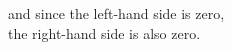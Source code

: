 \documentclass[preview]{standalone}
\begin{document}
\begin{center}
and since the left-hand side is zero,\\ the right-hand side is also zero.\\
\end{center}
\end{document}
